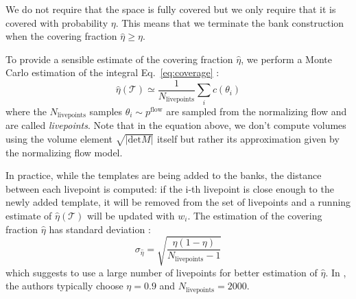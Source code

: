 \documentclass[twocolumn,showpacs,preprintnumbers,nofootinbib,prd,
superscriptaddress,10pt]{revtex4-2}
\begin{document}
We do not require that the space is fully covered but we only require that it is covered with probability $\eta$. This means that we terminate the bank construction when the covering fraction $\hat{\eta} \geq \eta$.

To provide a sensible estimate of the covering fraction $\hat{\eta}$, we perform a Monte Carlo estimation of the integral Eq.~\eqref{eq:coverage} \cite{Coogan:2022qxs}:
\begin{equation}\label{eq:coverage_estimate}
	\hat{\eta}(\mathcal{T}) \simeq \frac{1}{N_\text{livepoints}} \sum_i c(\theta_i)
\end{equation}
%
where the $N_\text{livepoints}$ samples $\theta_i \sim p^\text{flow}$ are sampled from the normalizing flow and are called {\it livepoints}.
Note that in the equation above, we don't compute volumes using the volume element $\sqrt{|\text{det}M|}$ itself but rather its approximation given by the normalizing flow model.


In practice, while the templates are being added to the banks, the distance between each livepoint is computed: if the i-th livepoint is close enough to the newly added template, it will be removed from the set of livepoints and a running estimate of $\hat{\eta}(\mathcal{T})$ will be updated with $w_i$.
The estimation of the covering fraction $\hat{\eta}$ has standard deviation \cite[App. A]{Coogan:2022qxs}:
\begin{equation}\label{eq:variance_coverage}
	\sigma_{\hat{\eta}} = \sqrt{\frac{\eta(1-\eta)}{N_\text{livepoints}-1}}
\end{equation}
which suggests to use a large number of livepoints for better estimation of $\hat{\eta}$.
In \cite{Coogan:2022qxs}, the authors typically choose $\eta = 0.9$ and $N_\text{livepoints} = 2000$.
\end{document}
